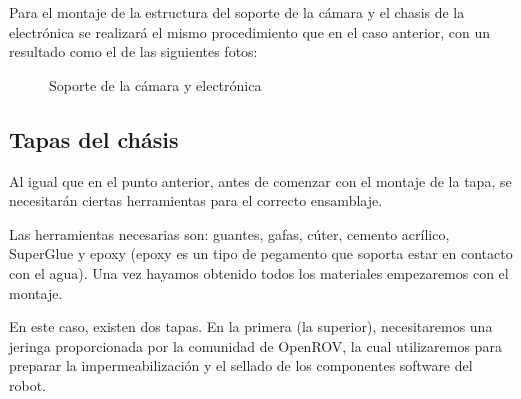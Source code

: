 Para el montaje de la estructura del soporte de la cámara y el chasis de la electrónica se realizará el mismo procedimiento que en el caso anterior, con un resultado como el de las siguientes fotos:

\begin{figure}[hbtp]
  \begin{center}
  \end{center}
  \caption{Soporte de la cámara y electrónica}
  \label{fig:ROV-chasis}
\end{figure}

\subsection{Tapas del chásis}
\label{subsec:tapasChasis}

Al igual  que en el punto anterior, antes de comenzar con el montaje de la tapa, se necesitarán ciertas herramientas para el correcto ensamblaje.

Las herramientas necesarias son: guantes, gafas, cúter, cemento acrílico, SuperGlue y epoxy (epoxy es un tipo de pegamento que soporta estar en contacto con el agua). Una vez hayamos obtenido todos los materiales empezaremos con el montaje.

En este caso, existen dos tapas. En la primera (la superior), necesitaremos una jeringa proporcionada por la comunidad de OpenROV, la cual utilizaremos para preparar la impermeabilización y el sellado de los componentes software del robot.

